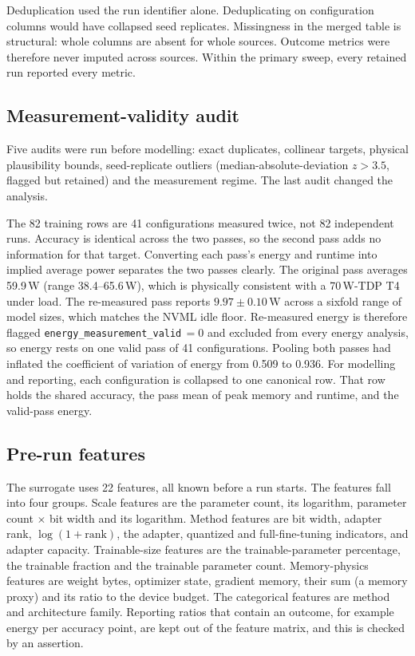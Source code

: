\documentclass[conference]{IEEEtran}
\begin{document}
Deduplication used the run identifier alone. Deduplicating on configuration columns would
have collapsed seed replicates. Missingness in the merged table is structural: whole
columns are absent for whole sources. Outcome metrics were therefore never imputed across
sources. Within the primary sweep, every retained run reported every metric. %

\subsection{Measurement-validity audit}

Five audits were run before modelling: exact duplicates, collinear targets, physical
plausibility bounds, seed-replicate outliers (median-absolute-deviation $z>3.5$, flagged but
retained) and the measurement regime. %
The last audit changed the analysis.

The 82 training rows are 41 configurations measured twice, not 82 independent runs.
Accuracy is identical across the two passes, so the second pass adds no information for that
target. Converting each pass's energy and runtime into implied average power separates the
two passes clearly. The original pass averages 59.9\,W (range 38.4--65.6\,W), which is
physically consistent with a 70\,W-TDP T4 under load. The re-measured pass reports
$9.97\pm0.10$\,W across a sixfold range of model sizes, which matches the NVML idle floor. %
Re-measured energy is therefore flagged \texttt{energy\_measurement\_valid}$\,=0$ and excluded
from every energy analysis, so energy rests on one valid pass of 41 configurations. Pooling
both passes had inflated the coefficient of variation of energy from 0.509 to 0.936. %
For modelling and reporting, each configuration is collapsed to one canonical row. That row
holds the shared accuracy, the pass mean of peak memory and runtime, and the valid-pass
energy. %

\subsection{Pre-run features}

The surrogate uses 22 features, all known before a run starts. %
The features fall into four groups.
Scale features are the parameter count, its logarithm, parameter count $\times$ bit width and
its logarithm.
Method features are bit width, adapter rank, $\log(1+\text{rank})$, the adapter, quantized and
full-fine-tuning indicators, and adapter capacity.
Trainable-size features are the trainable-parameter percentage, the trainable fraction and
the trainable parameter count.
Memory-physics features are weight bytes, optimizer state, gradient memory, their sum
(a memory proxy) and its ratio to the device budget. The categorical features are method and
architecture family.
Reporting ratios that contain an outcome, for example energy per accuracy point, are kept out
of the feature matrix, and this is checked by an assertion. %
\end{document}
